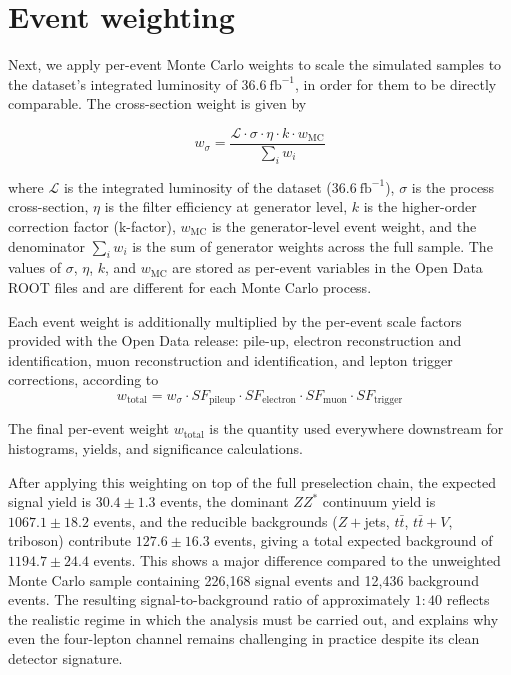 \documentclass[conference]{IEEEtran}
\begin{document}
{\section{Event weighting}
Next, we apply per-event Monte Carlo weights to scale the simulated samples to the dataset’s integrated luminosity of $36.6~\mathrm{fb}^{-1}$, in order for them to be directly comparable. The cross-section weight is given by

\begin{equation}
w_{\sigma} =
\frac{
\mathcal{L} \cdot \sigma \cdot \eta \cdot k \cdot w_{\mathrm{MC}}
}{
\sum_i w_i
}
\label{eq:xsec_weight}
\end{equation}

where $\mathcal{L}$ is the integrated luminosity of the dataset ($36.6~\mathrm{fb}^{-1}$), $\sigma$ is the process cross-section, $\eta$ is the filter efficiency at generator level, $k$ is the higher-order correction factor (k-factor), $w_{\mathrm{MC}}$ is the generator-level event weight, and the denominator $\sum_i w_i$ is the sum of generator weights across the full sample. The values of $\sigma$, $\eta$, $k$, and $w_{\mathrm{MC}}$ are stored as per-event variables in the Open Data ROOT files and are different for each Monte Carlo process.

Each event weight is additionally multiplied by the per-event scale factors provided with the Open Data release: pile-up, electron reconstruction and identification, muon reconstruction and identification, and lepton trigger corrections, according to
\begin{equation}
w_{\mathrm{total}} =
w_{\sigma} \cdot
SF_{\mathrm{pileup}} \cdot
SF_{\mathrm{electron}} \cdot
SF_{\mathrm{muon}} \cdot
SF_{\mathrm{trigger}}
\label{eq:total_weight}
\end{equation}

The final per-event weight $w_{\mathrm{total}}$ is the quantity used everywhere downstream for histograms, yields, and significance calculations.

After applying this weighting on top of the full preselection chain, the expected signal yield is $30.4 \pm 1.3$ events, the dominant $ZZ^{*}$ continuum yield is $1067.1 \pm 18.2$ events, and the reducible backgrounds ($Z+$jets, $t\bar{t}$, $t\bar{t}+V$, triboson) contribute $127.6 \pm 16.3$ events, giving a total expected background of $1194.7 \pm 24.4$ events. This shows a major difference compared to the unweighted Monte Carlo sample containing 226{,}168 signal events and 12{,}436 background events. The resulting signal-to-background ratio of approximately $1:40$ reflects the realistic regime in which the analysis must be carried out, and explains why even the four-lepton channel remains challenging in practice despite its clean detector signature.


}
\end{document}
